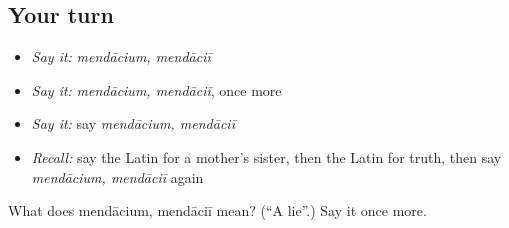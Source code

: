 \subsection*{Your turn}
\begin{itemize}
\raggedright
  \item \emph{Say it:} \emph{mendācium, mendāciī}
  \item \emph{Say it:} \emph{mendācium, mendāciī}, once more
  \item \emph{Say it:} say \emph{mendācium, mendāciī}
  \item \emph{Recall:} say the Latin for a mother's sister, then the Latin for truth, then say \emph{mendācium, mendāciī} again
\end{itemize}

\begin{tcolorbox}[breakable,colback=teal!4,colframe=teal!35!black,title={Before you move on}]
What does mendācium, mendāciī mean? (\textquotedblleft{}A lie\textquotedblright{}.) Say it once more.
\end{tcolorbox}
